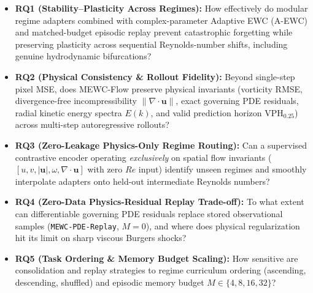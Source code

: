 \documentclass[11pt,a4paper]{article}
\begin{document}
\begin{itemize}
  \item \textbf{RQ1 (Stability--Plasticity Across Regimes):} How effectively do modular regime adapters combined with complex-parameter Adaptive EWC (A-EWC) and matched-budget episodic replay prevent catastrophic forgetting while preserving plasticity across sequential Reynolds-number shifts, including genuine hydrodynamic bifurcations?
  \item \textbf{RQ2 (Physical Consistency \& Rollout Fidelity):} Beyond single-step pixel MSE, does MEWC-Flow preserve physical invariants (vorticity RMSE, divergence-free incompressibility $\|\nabla\cdot\mathbf{u}\|$, exact governing PDE residuals, radial kinetic energy spectra $E(k)$, and valid prediction horizon $\text{VPH}_{0.25}$) across multi-step autoregressive rollouts?
  \item \textbf{RQ3 (Zero-Leakage Physics-Only Regime Routing):} Can a supervised contrastive encoder operating \emph{exclusively} on spatial flow invariants ($[u, v, |\mathbf{u}|, \omega, \nabla\cdot\mathbf{u}]$ with zero $Re$ input) identify unseen regimes and smoothly interpolate adapters onto held-out intermediate Reynolds numbers?
  \item \textbf{RQ4 (Zero-Data Physics-Residual Replay Trade-off):} To what extent can differentiable governing PDE residuals replace stored observational samples (\texttt{MEWC-PDE-Replay}, $M=0$), and where does physical regularization hit its limit on sharp viscous Burgers shocks?
  \item \textbf{RQ5 (Task Ordering \& Memory Budget Scaling):} How sensitive are consolidation and replay strategies to regime curriculum ordering (ascending, descending, shuffled) and episodic memory budget $M \in \{4, 8, 16, 32\}$?
\end{itemize}
\end{document}
